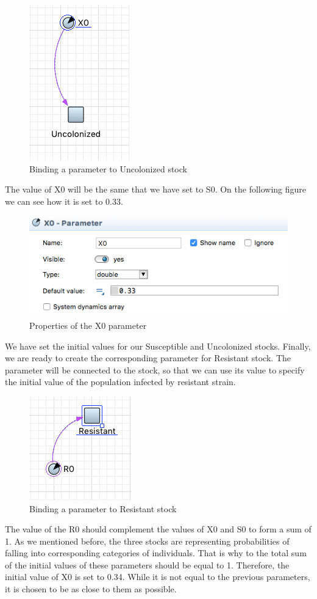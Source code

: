 \begin{figure}[H]
  \centering
  \includegraphics[height=0.3\textwidth]{img/screens/basic/basic9}
  \caption{Binding a parameter to Uncolonized stock}
\end{figure}

The value of X0 will be the same that we have set to S0. On the following figure we can see how it is set to 0.33.

\begin{figure}[H]
  \centering
  \includegraphics[height=0.3\textwidth]{img/screens/basic/basic6}
  \caption{Properties of the X0 parameter}
\end{figure}

We have set the initial values for our Susceptible and Uncolonized stocks. Finally, we are ready to create the corresponding parameter for Resistant stock. The parameter will be connected to the stock, so that we can use its value to specify the initial value of the population infected by resistant strain.

\begin{figure}[H]
  \centering
  \includegraphics[height=0.2\textwidth]{img/screens/basic/basic10}
  \caption{Binding a parameter to Resistant stock}
\end{figure}

The value of the R0 should complement the values of X0 and S0 to form a sum of 1. As we mentioned before, the three stocks are representing probabilities of falling into corresponding categories of individuals. That is why to the total sum of the initial values of these parameters should be equal to 1. Therefore, the initial value of X0 is set to 0.34. While it is not equal to the previous parameters, it is chosen to be as close to them as possible.

